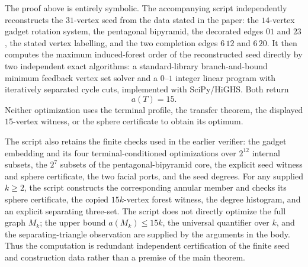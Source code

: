 \documentclass[11pt]{article}
\theoremstyle{definition}
\theoremstyle{remark}
\begin{document}
The proof above is entirely symbolic.  The accompanying script
 independently reconstructs the
$31$-vertex seed from the data stated in the paper: the $14$-vertex gadget
rotation system, the pentagonal bipyramid, the decorated edges $01$ and
$23$, the stated vertex labelling, and the two completion edges $6\,12$
and $6\,20$.  It then computes the maximum induced-forest order of the
reconstructed seed directly by two independent exact algorithms: a
standard-library branch-and-bound minimum feedback vertex set solver and
a $0$--$1$ integer linear program with iteratively separated cycle cuts,
implemented with SciPy/HiGHS.  Both return
\[
 a(T)=15.
\]
Neither optimization uses the terminal profile, the transfer theorem, the
displayed $15$-vertex witness, or the sphere certificate to obtain its
optimum.

The script also retains the finite checks used in the earlier verifier:
the gadget embedding and its four terminal-conditioned optimizations over
$2^{12}$ internal subsets, the $2^7$ subsets of the
pentagonal-bipyramid core, the explicit seed witness and sphere
certificate, the two facial ports, and the seed degrees. For any supplied
$k\ge2$, the script constructs the corresponding annular member and checks 
its sphere certificate, the copied $15k$-vertex forest witness, the degree 
histogram, and an explicit separating three-set.  The script does not directly
optimize the full graph $M_k$; the upper bound $a(M_k)\le15k$, the
universal quantifier over $k$, and the separating-triangle observation
are supplied by the arguments in the body.  Thus the computation is redundant
independent certification of the finite seed and construction data rather
than a premise of the main theorem.
\end{document}
